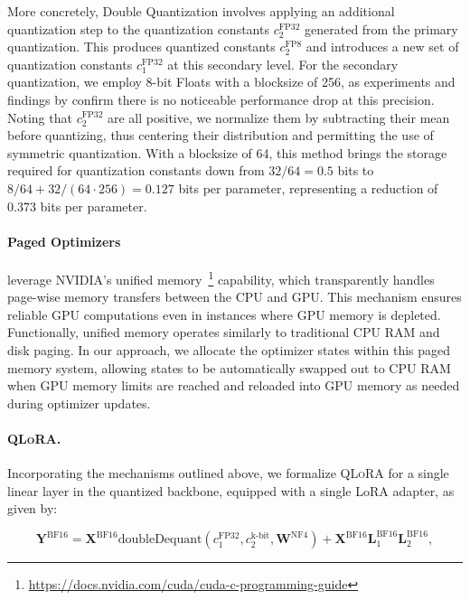 More concretely, Double Quantization involves applying an additional quantization step to the quantization constants $c_2^{\text{FP32}}$ generated from the primary quantization. This produces quantized constants $c_2^{\text{FP8}}$ and introduces a new set of quantization constants $c_1^{\text{FP32}}$ at this secondary level. For the secondary quantization, we employ 8-bit Floats with a blocksize of 256, as experiments and findings by \citet{dettmers2022case} confirm there is no noticeable performance drop at this precision. Noting that $c_2^{\text{FP32}}$ are all positive, we normalize them by subtracting their mean before quantizing, thus centering their distribution and permitting the use of symmetric quantization. With a blocksize of 64, this method brings the storage required for quantization constants down from $32/64=0.5$ bits to $8/64 + 32/(64\cdot256) = 0.127$ bits per parameter, representing a reduction of 0.373 bits per parameter.

\paragraph{Paged Optimizers} leverage NVIDIA's unified memory~\footnote{\tiny \url{https://docs.nvidia.com/cuda/cuda-c-programming-guide}} capability, which transparently handles page-wise memory transfers between the CPU and GPU. This mechanism ensures reliable GPU computations even in instances where GPU memory is depleted. Functionally, unified memory operates similarly to traditional CPU RAM and disk paging. In our approach, we allocate the optimizer states within this paged memory system, allowing states to be automatically swapped out to CPU RAM when GPU memory limits are reached and reloaded into GPU memory as needed during optimizer updates.

\paragraph{\textsc{QLoRA}.} Incorporating the mechanisms outlined above, we formalize \textsc{QLoRA} for a single linear layer in the quantized backbone, equipped with a single LoRA adapter, as given by:

\begin{equation}
    \mathbf{Y}^{\text{BF16}} =  \mathbf{X}^{\text{BF16}} \text{doubleDequant}(c_1^{\text{FP32}}, c_2^{\text{k-bit}}, \mathbf{W}^{\text{NF4}}) + \mathbf{X}^{\text{BF16}}\mathbf{L}^{\text{BF16}}_1\mathbf{L}^{\text{BF16}}_2,
\end{equation}

